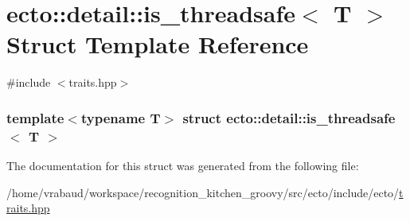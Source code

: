 \hypertarget{structecto_1_1detail_1_1is__threadsafe}{\section{ecto\-:\-:detail\-:\-:is\-\_\-threadsafe$<$ \-T $>$ \-Struct \-Template \-Reference}
\label{structecto_1_1detail_1_1is__threadsafe}
}


{\ttfamily \#include $<$traits.\-hpp$>$}

\subsubsection*{template$<$typename T$>$ struct ecto\-::detail\-::is\-\_\-threadsafe$<$ T $>$}



\-The documentation for this struct was generated from the following file\-:\begin{DoxyCompactItemize}
\item 
/home/vrabaud/workspace/recognition\-\_\-kitchen\-\_\-groovy/src/ecto/include/ecto/\hyperlink{traits_8hpp}{traits.\-hpp}\end{DoxyCompactItemize}
